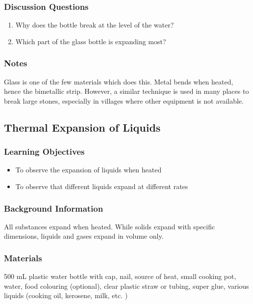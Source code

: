 \subsubsection*{Discussion Questions}
\begin{enumerate}
\item{Why does the bottle break at the level of the water?}
\item{Which part of the glass bottle is expanding most?}
\end{enumerate}

\subsubsection*{Notes}
Glass is one of the few materials which does this.  Metal bends when heated, hence the bimetallic strip.  However, a similar technique is used in many places to break large stones, especially in villages where other equipment is not available.


\subsection{Thermal Expansion of Liquids}

\subsubsection*{Learning Objectives}
\begin{itemize}
\item{To observe the expansion of liquids when heated} 
\item{To observe that different liquids expand at different rates} 
\end{itemize}

\subsubsection*{Background Information}
All substances expand when heated. While solids expand with specific dimensions, liquids and gases expand in volume only.  

\subsubsection*{Materials}
500 mL plastic water bottle with cap, nail, source of heat, small cooking pot, water, food colouring (optional), clear plastic straw or tubing, super glue, various liquids (cooking oil, kerosene, milk, etc.  )

